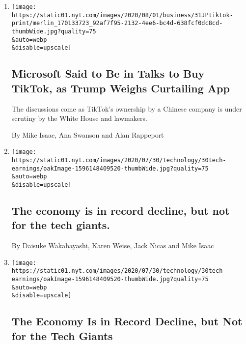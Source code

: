 \begin{enumerate}
\def\labelenumi{\arabic{enumi}.}
\item
  \href{/2020/07/31/technology/tiktok-microsoft.html}{}

  \texttt{[image: https://static01.nyt.com/images/2020/08/01/business/31JPtiktok-print/merlin\_170133723\_92af7f95-2132-4ee6-bc4d-638fcf0dc8cd-thumbWide.jpg?quality=75\\\&auto=webp\\\&disable=upscale]}

  \hypertarget{microsoft-said-to-be-in-talks-to-buy-tiktok-as-trump-weighs-curtailing-app}{%
  \subsection{Microsoft Said to Be in Talks to Buy TikTok, as Trump
  Weighs Curtailing
  App}\label{microsoft-said-to-be-in-talks-to-buy-tiktok-as-trump-weighs-curtailing-app}}

  The discussions come as TikTok's ownership by a Chinese company is
  under scrutiny by the White House and lawmakers.

  By Mike Isaac, Ana Swanson and Alan Rappeport
\item
  \href{/live/2020/07/31/business/stock-market-today-coronavirus/the-economy-is-in-record-decline-but-not-for-the-tech-giants}{}

  \texttt{[image: https://static01.nyt.com/images/2020/07/30/technology/30tech-earnings/oakImage-1596148409520-thumbWide.jpg?quality=75\\\&auto=webp\\\&disable=upscale]}

  \hypertarget{the-economy-is-in-record-decline-but-not-for-the-tech-giants}{%
  \subsection{The economy is in record decline, but not for the tech
  giants.}\label{the-economy-is-in-record-decline-but-not-for-the-tech-giants}}

  By Daisuke Wakabayashi, Karen Weise, Jack Nicas and Mike Isaac
\item
  \href{/2020/07/30/technology/tech-company-earnings-amazon-apple-facebook-google.html}{}

  \texttt{[image: https://static01.nyt.com/images/2020/07/30/technology/30tech-earnings/oakImage-1596148409520-thumbWide.jpg?quality=75\\\&auto=webp\\\&disable=upscale]}

  \hypertarget{the-economy-is-in-record-decline-but-not-for-the-tech-giants-1}{%
  \subsection{The Economy Is in Record Decline, but Not for the Tech
  Giants}\label{the-economy-is-in-record-decline-but-not-for-the-tech-giants-1}}


\end{enumerate}
